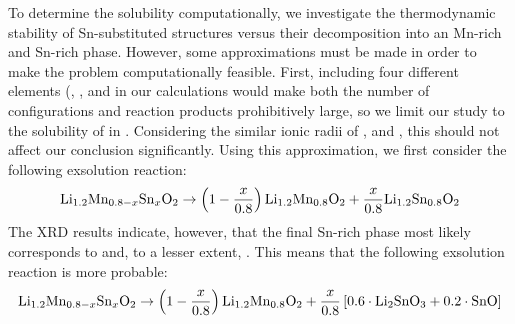 \begin{refsection}
To determine the  solubility computationally, we investigate the 
thermodynamic stability of Sn-substituted structures versus their 
decomposition into an Mn-rich and Sn-rich phase. However, some approximations 
must be made in order to make the problem computationally feasible. First, 
including four different elements (, ,  and  in 
our calculations would make both the number of configurations and reaction 
products prohibitively large, so we limit our study to the solubility of 
 in . Considering the similar ionic radii of 
,  and , this should not affect our 
conclusion significantly. Using this approximation, we first consider the 
following exsolution reaction: 
\begin{equation} 
 \ce{Li_{1.2}Mn_{0.8-x}Sn_xO2} \rightarrow  \left( 1 - \frac{x}{0.8} \right) 
\ce{Li_{1.2}Mn_{0.8}O2} +  \frac{x}{0.8} \ce{Li_{1.2}Sn_{0.8}O2}  
\end{equation} 
The XRD results indicate, however, that the final Sn-rich phase most likely 
corresponds to  and, to a lesser extent, . This means that 
the following exsolution reaction is more probable: 
\begin{equation} \label{batteries:eq-exsolution} 
 \ce{Li_{1.2}Mn_{0.8-x}Sn_xO2} \rightarrow  \left( 1 - \frac{x}{0.8} \right) 
\ce{Li_{1.2}Mn_{0.8}O2} +  \frac{x}{0.8} \left[  0.6 \cdot \ce{Li2SnO3} + 0.2 
\cdot \ce{SnO} \right] 
\end{equation} 
 

\end{refsection}
